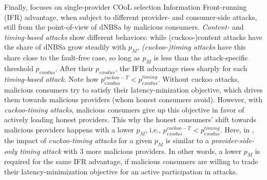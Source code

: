 Finally,  focuses on single-provider COoL selection Information Front-running (IFR) advantage, when subject to different provider- and consumer-side attacks, still from the point-of-view of dNBSa by malicious consumers. 
\emph{Content-} and \emph{timing-based attacks} show different behaviors: while (cuckoo-)content attacks have the share of dNBSa grow steadily with $p_{M}$, \emph{(cuckoo-)timing attacks} have this share close to the fault-free case, so long as $p_{M}$ is less than the attack-specific threshold $p_{exodus}$.
After their $p_{exodus}$, the IFR advantage rises sharply for each \emph{timing-based attack}.
Note how $p_{exodus}^{cuckoo-T}<p_{exodus}^{timing}$.
Without cuckoo attacks, malicious consumers try to satisfy their latency-minization objective, which drives them towards malicious providers (whom honest consumers avoid).
However, with \emph{cuckoo-timing attacks}, malicious consumers give up this objective in favor of actively loading honest providers.
This why the honest consumers' shift towards malicious providers happens with a lower $p_{M}$, i.e., $p_{exodus}^{cuckoo-T}<p_{exodus}^{timing}$.
Here, in , the impact of \emph{cuckoo-timing attacks} for a given $p_{M}$ is similar to a \emph{provider-side-only timing attack} with 3 more malicious providers.
In other words, a lower $p_{M}$ is required for the same IFR advantage, if malicious consumers are willing to trade their latency-minimization objective for an active participation in attacks.

